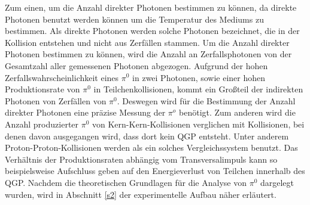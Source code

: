 \newline
Zum einen, um die Anzahl direkter Photonen bestimmen zu k\"onnen, da direkte Photonen benutzt werden k\"onnen um die Temperatur des Mediums zu bestimmen.
Als direkte Photonen werden solche Photonen bezeichnet, die in der Kollision entstehen und nicht aus Zerf\"allen stammen.
Um die Anzahl direkter Photonen bestimmen zu k\"onnen, wird die Anzahl an Zerfallsphotonen von der Gesamtzahl aller gemessenen Photonen abgezogen.
Aufgrund der hohen Zerfallswahrscheinlichkeit eines $\pi^{0}$ in zwei Photonen, sowie einer hohen Produktionsrate von $\pi^{0}$ in Teilchenkollisionen, kommt ein Gro{\ss}teil der indirekten Photonen von Zerf\"allen von $\pi^{0}$.
Deswegen wird f\"ur die Bestimmung der Anzahl direkter Photonen eine pr\"azise Messung der $\pi^{o}$ ben\"otigt.
\newline
Zum anderen wird die Anzahl produzierter $\pi^{0}$ von Kern-Kern-Kollisionen verglichen mit Kollisionen, bei denen davon ausgegangen wird, dass dort kein QGP entsteht.
Unter anderem Proton-Proton-Kollisionen werden als ein solches Vergleichssystem benutzt.
Das Verh\"altnis der Produktionsraten abh\"angig vom Transversalimpuls kann so beispielsweise Aufschluss geben auf den Energieverlust von Teilchen innerhalb des QGP.
\newline
Nachdem die theoretischen Grundlagen f\"ur die Analyse von $\pi^{0}$ dargelegt wurden, wird in Abschnitt \ref{s2} der experimentelle Aufbau n\"aher erl\"autert.